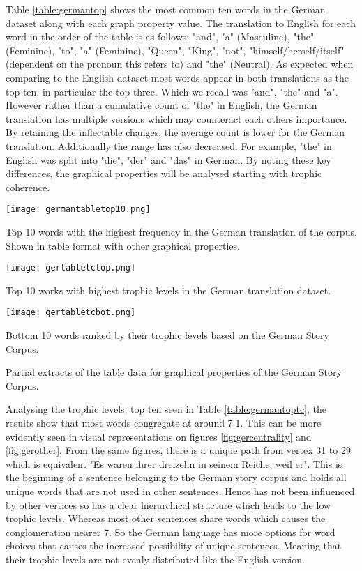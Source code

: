 Table \ref{table:germantop} shows the most common ten words in the German dataset along with each graph property value. The translation to English for each word in the order of the table is as follows; "and", "a" (Masculine), "the" (Feminine), "to", "a" (Feminine), "Queen", "King", "not", "himself/herself/itself" (dependent on the pronoun this refers to) and "the" (Neutral). As expected when comparing to the English dataset most words appear in both translations as the top ten, in particular the top three. Which we recall was "and", "the" and "a". However rather than a cumulative count of "the" in English, the German translation has multiple versions which may counteract each others importance. By retaining the inflectable changes, the average count is lower for the German translation. Additionally the range has also decreased. For example, "the" in English was split into "die", "der" and "das" in German. By noting these key differences, the graphical properties will be analysed starting with trophic coherence.

\begin{table}[H]
\centering
\texttt{[image: germantabletop10.png]}
\caption{Top 10 words with the highest frequency in the German translation of the corpus. Shown in table format with other graphical properties. }
\label{table:germantop}
\end{table}

\begin{table}[H]
\centering
\begin{subtable}{.45\textwidth}
	\centering
	\texttt{[image: gertabletctop.png]}
	\caption{Top 10 works with highest trophic levels in the German translation dataset.}
	\label{table:germantoptc}
\end{subtable}
\hfill
\begin{subtable}{.45\textwidth}
	\centering
	\texttt{[image: gertabletcbot.png]}
	\caption{Bottom 10 words ranked by their trophic levels based on the German Story Corpus.}
	\label{table:germanbottc}
\end{subtable}
\caption{Partial extracts of the table data for graphical properties of the German Story Corpus.}
\end{table}

Analysing the trophic levels, top ten seen in Table \ref{table:germantoptc}, the results show that most words congregate at around 7.1. This can be more evidently seen in visual representations on figures \ref{fig:gercentrality} and \ref{fig:gerother}. From the same figures, there is a unique path from vertex 31 to 29 which is equivalent "Es waren ihrer dreizehn in seinem Reiche, weil er". This is the beginning of a sentence belonging to the German story corpus and holds all unique words that are not used in other sentences. Hence has not been influenced by other vertices so has a clear hierarchical structure which leads to the low trophic levels. Whereas most other sentences share words which causes the conglomeration nearer 7. So the German language has more options for word choices that causes the increased possibility of unique sentences. Meaning that their trophic levels are not evenly distributed like the English version. 

